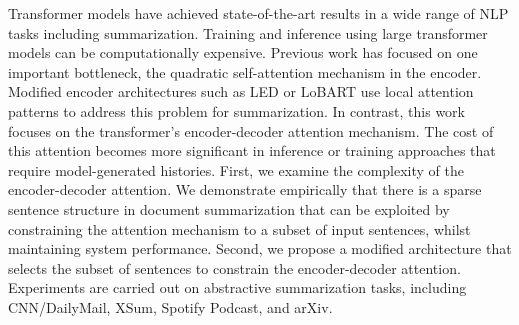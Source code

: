 Transformer models have achieved state-of-the-art results in a wide range of NLP tasks including summarization. Training and inference using large transformer models can be computationally expensive. Previous work has focused on one important bottleneck, the quadratic self-attention mechanism in the encoder. Modified encoder architectures such as LED or LoBART use local attention patterns to address this problem for summarization. In contrast, this work focuses on the transformer's encoder-decoder attention mechanism. The cost of this attention becomes more significant in inference or training approaches that require model-generated histories. First, we examine the complexity of the encoder-decoder attention. We demonstrate empirically that there is a sparse sentence structure in document summarization that can be exploited by constraining the attention mechanism to a subset of input sentences, whilst maintaining system performance. Second, we propose a modified architecture that selects the subset of sentences to constrain the encoder-decoder attention. Experiments are carried out on abstractive summarization tasks, including CNN/DailyMail, XSum, Spotify Podcast, and arXiv.
